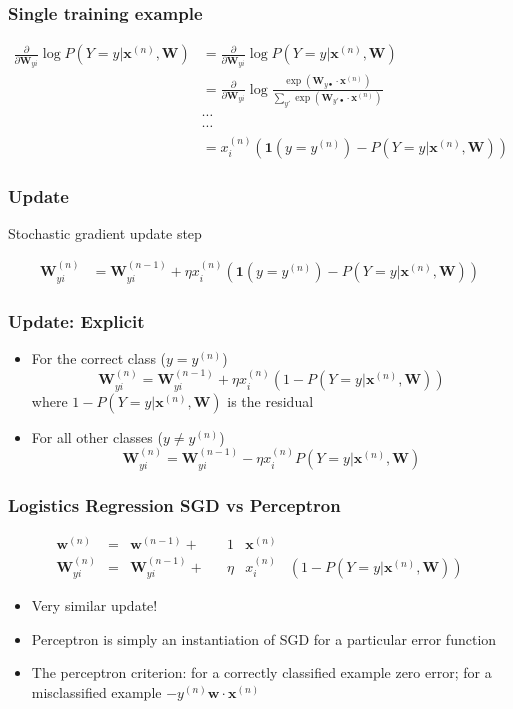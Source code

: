 \documentclass[14pt,mathserif,dvipsnames,usenames]{beamer}
\newcommand{\x}{\mathbf{x}}
\newcommand{\w}{\mathbf{w}}
\newcommand{\W}{\mathbf{W}}
\newcommand{\voc}[1]{{\color{ForestGreen}#1}}
\begin{document}
\begin{frame}
  \frametitle{Single training example}
  \begin{small}
    \begin{align*}
\frac{\partial}{\partial \W_{yi}} \log
        P(Y=y|\x^{(n)},\W)
      & = \frac{\partial }{\partial \W_{yi}} \log P(Y=y|\x^{(n)},\W) \\
      & = \frac{\partial }{\partial \W_{yi}} \log
      \frac{\exp(\W_{y\bullet} \cdot \x^{(n)})} {\sum_{y'}
        \exp(\W_{y'\bullet}
        \cdot \x^{(n)})}\\
      &  \cdots \\
      &  \cdots \\
      & = x_i^{(n)}(\mathbf{1}(y = y^{(n)})-P(Y=y|\x^{(n)},\W))
    \end{align*}
  \end{small}

\end{frame}

\begin{frame}\frametitle{Update}
\begin{block}{Stochastic gradient update step}
  \begin{small}
    \begin{align*}
      \W_{yi}^{(n)} & = \W_{yi}^{(n-1)} + \eta x_i^{(n)}(\mathbf{1}(y
      = y^{(n)})-P(Y=y|\x^{(n)},\W))
    \end{align*}
  \end{small}
  \end{block}
\end{frame}
  
\begin{frame}\frametitle{Update: Explicit}
  \begin{itemize}
  \item For the correct class ($y = y^{(n)}$)
    \[
    \W_{yi}^{(n)}  = \W_{yi}^{(n-1)} + \eta x_i^{(n)}(1-P(Y=y|\x^{(n)},\W))
    \]
    where $1-P(Y=y|\x^{(n)},\W)$ is the \voc{residual}\vskip 0.5cm
  \item For all other classes ($y \neq y^{(n)}$)
    \[
    \W_{yi}^{(n)}  = \W_{yi}^{(n-1)} - \eta x_i^{(n)}P(Y=y|\x^{(n)},\W)
    \]
  \end{itemize}
\end{frame}

\begin{frame}
  \frametitle{Logistics Regression SGD vs Perceptron}
\begin{align*}
\w^{(n)}  & = & \w^{(n-1)} + && 1 & \x^{(n)} & \\
    \W_{yi}^{(n)}  & = & \W_{yi}^{(n-1)} + && \eta & x_i^{(n)}& (1-P(Y=y|\x^{(n)},\W))
  \end{align*}
  \begin{itemize}
  \item Very similar update!
  \item Perceptron is simply an instantiation
    of SGD for a particular error function
  \item The perceptron criterion: for a correctly
    classified example zero error; for a misclassified example
    $-y^{(n)}\w\cdot\x^{(n)}$
  \end{itemize}
\end{frame}
\end{document}
